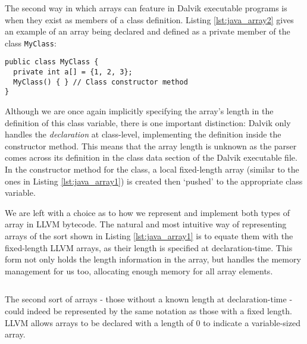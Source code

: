 The second way in which arrays can feature in Dalvik executable programs is when they exist as members of a class definition. Listing \ref{lst:java_array2} gives an example of an array being declared and defined as a private member of the class \verb|MyClass|:

\begin{lstlisting}[frame=single, caption={Arrays as class members in Java}, label={lst:java_array2}]
public class MyClass {
  private int a[] = {1, 2, 3};
  MyClass() { } // Class constructor method
}
\end{lstlisting}

Although we are once again implicitly specifying the array's length in the definition of this class variable, there is one important distinction: Dalvik only handles the \textit{declaration} at class-level, implementing the definition inside the constructor method. This means that the array length is unknown as the parser comes across its definition in the class data section of the Dalvik executable file. In the constructor method for the class, a local fixed-length array (similar to the ones in Listing \ref{lst:java_array1}) is created then `pushed' to the appropriate class variable.

We are left with a choice as to how we represent and implement both types of array in LLVM bytecode. The natural and most intuitive way of representing arrays of the sort shown in Listing \ref{lst:java_array1} is to equate them with the fixed-length LLVM arrays, as their length is specified at declaration-time. This form not only holds the length information in the array, but handles the memory management for us too, allocating enough memory for all array elements.

\lstset{
	language=Assembly,
	basicstyle=\small,
	stringstyle=\ttfamily
}

\begin{lstlisting}[frame=single, caption={LLVM fixed-length array}, label=lst:llvm_fix]
%a = [3 x i32]
\end{lstlisting}

The second sort of arrays - those without a known length at declaration-time - could indeed be represented by the same notation as those with a fixed length. LLVM allows arrays to be declared with a length of 0 to indicate a variable-sized array.

\begin{lstlisting}[frame=single, caption={LLVM variable-length array}, label=lst:llvm_var]
%a = [0 x i32]
\end{lstlisting}


